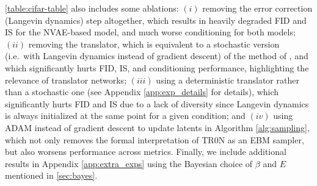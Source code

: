 \documentclass[nohyperref]{article}
\theoremstyle{plain}
\theoremstyle{definition}
\theoremstyle{remark}
\begin{document}
\autoref{table:cifar-table} also includes some ablations: $(i)$ removing the error correction (Langevin dynamics) step altogether, which results in heavily degraded FID and IS for the NVAE-based model, and much worse conditioning for both models; $(ii)$ removing the translator, which is equivalent to a stochastic version (i.e.\ with Langevin dynamics instead of gradient descent) of the method of \citet{nguyen2016synthesizing}, and which significantly hurts FID, IS, and conditioning performance, highlighting the relevance of translator networks; $(iii)$ using a deterministic translator rather than a stochastic one (see Appendix \ref{app:exp_details} for details), which significantly hurts FID and IS due to a lack of diversity since Langevin dynamics is always initialized at the same point for a given condition; and $(iv)$ using ADAM instead of gradient descent to update latents in Algorithm \ref{alg:sampling}, which not only removes the formal interpretation of TR0N as an EBM sampler, but also worsens performance across metrics. Finally, we include additional results in Appendix \ref{app:extra_exps} using the Bayesian choice of $\beta$ and $E$ mentioned in \autoref{sec:bayes}.
\end{document}
